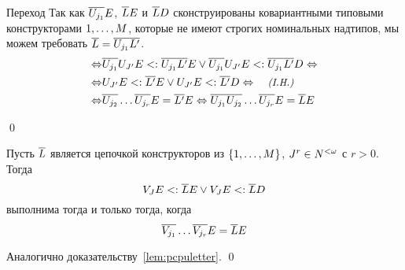 \begin{proof*}
\begin{paragraph}{Переход}
Так как  $\overline{{U}_{j_1}}{E}$, $\overline{{L}{}}{E}$ и $\overline{{L}{}}D$ сконструированы ковариантными типовыми конструкторами ${1},\ldots,{M}$, которые не имеют строгих номинальных надтипов, мы можем требовать $\overline{{L}{}}=\overline{{U}_{j_1}}\overline{{L}{}'}$.
\begin{align*}
     \Leftrightarrow&\overline{\pcpuword{j_1}}\pcpuword{J'}\pcpeconstr \subtype \overline{\pcpuword{j_1}}\overline{\pcplword{}'}\pcpeconstr \lor \overline{\pcpuword{j_1}}\pcpuword{J'}\pcpeconstr \subtype \overline{\pcpuword{j_1}}\overline{\pcplword{}'}\pcpdword \Leftrightarrow \\
     \Leftrightarrow&\pcpuword{J'}\pcpeconstr \subtype \overline{\pcplword{}'}\pcpeconstr \lor \pcpuword{J'}\pcpeconstr \subtype \overline{\pcplword{}'}\pcpdword \Leftrightarrow \textit{\small{(I.H.)}}\\
     \Leftrightarrow&\overline{\pcpuword{j_2}}\ldots\overline{\pcpuword{j_r}}\pcpeconstr = \overline{\pcplword{}'}\pcpeconstr \Leftrightarrow \overline{\pcpuword{j_1}}\overline{\pcpuword{j_2}}\ldots\overline{\pcpuword{j_r}}\pcpeconstr = \overline{\pcplword{}}\pcpeconstr
\end{align*}
\end{paragraph}
%
\qed\end{proof*}

\begin{lem}{\label{lem:pcpvletter}}
Пусть $\overline{{L}{}}$ является цепочкой конструкторов из $\{{1}{},\ldots,{M}{}\}$, $J^r\in N^{<\omega}$ с $r > 0$. Тогда
\[
    {V}_{J}{E} <: \overline{{L}{}}{E} \lor {V}_{J}{E} <: \overline{{L}{}}D
\]
выполнима тогда и только тогда, когда
\[
     \overline{{V}_{j_1}}\ldots\overline{{V}_{j_r}}{E} = \overline{{L}{}}{E}
\]
\end{lem}
\begin{proof*}
Аналогично доказательству~\autoref{lem:pcpuletter}.
\qed\end{proof*}

